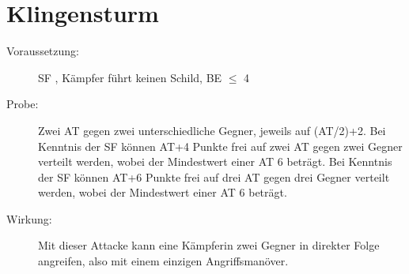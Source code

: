 \section{Klingensturm}
\label{aktion.klingensturm}
\begin{description}
    \item[Voraussetzung:]
        SF , Kämpfer führt keinen Schild, BE\textrm{ ${\leq}$ }4
    \item[Probe:]
        Zwei AT gegen zwei unterschiedliche Gegner, jeweils auf (AT/2)+2.\newline
        Bei Kenntnis der SF  können AT+4 Punkte frei auf zwei AT gegen zwei Gegner verteilt werden, wobei der Mindestwert einer AT 6 beträgt.\newline
        Bei Kenntnis der SF  können AT+6 Punkte frei auf drei AT gegen drei Gegner verteilt werden, wobei der Mindestwert einer AT 6 beträgt.
    \item[Wirkung:]
        Mit dieser Attacke kann eine Kämpferin zwei Gegner in direkter Folge angreifen, also mit einem einzigen Angriffsmanöver.
\end{description}
